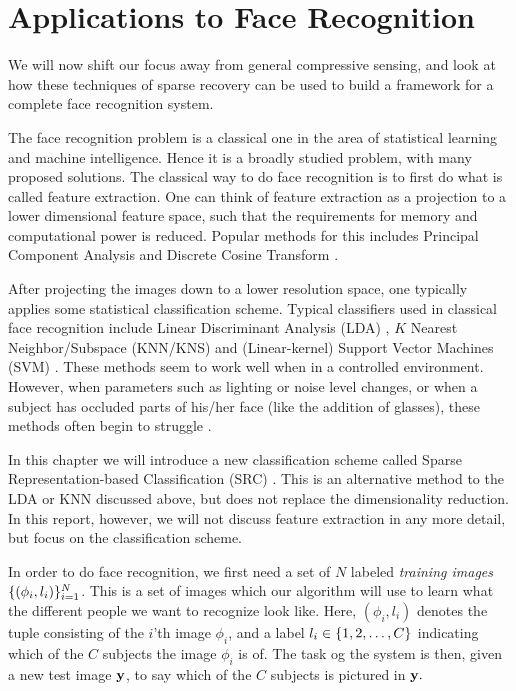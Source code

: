 \chapter{Applications to Face Recognition} \label{sec:applications}
We will now shift our focus away from general compressive sensing, and look at how these techniques of sparse recovery can be used to build a framework for a complete face recognition system. 

The face recognition problem is a classical one in the area of statistical learning and machine intelligence. Hence it is a broadly studied problem, with many proposed solutions. The classical way to do face recognition is to first do what is called feature extraction. One can think of feature extraction as a projection to a lower dimensional feature space, such that the requirements for memory and computational power is reduced. Popular methods for this includes Principal Component Analysis and Discrete Cosine Transform \cite{bhat2014performance}.

After projecting the images down to a lower resolution space, one typically applies some statistical classification scheme. Typical classifiers used in classical face recognition include  Linear Discriminant Analysis (LDA) \cite{bhat2014performance}, $ K $ Nearest Neighbor/Subspace (KNN/KNS) \cite{lee2005acquiring} and (Linear-kernel) Support Vector Machines (SVM) \cite{wright09facerecog}. These methods seem to work well when in a controlled environment. However, when parameters such as lighting or noise level changes, or when a subject has occluded parts of his/her face (like the addition of glasses), these methods often begin to struggle \cite{eldar12theoryapplic}.

In this chapter we will introduce a new classification scheme called Sparse Representation-based Classification (SRC) \cite{wright09facerecog}. This is an alternative method to the LDA or KNN discussed above, but does not replace the dimensionality reduction. In this report, however, we will not discuss feature extraction in any more detail, but focus on the classification scheme. 

In order to do face recognition, we first need a set of $ N $ labeled \textit{training images} $ \{(\phi_{i}, l_{i})\}_{i=1}^{N} $. This is a set of images which our algorithm will use to learn what the different people we want to recognize look like. Here, $ (\phi_{i}, l_{i}) $ denotes the tuple consisting of the $ i $'th image $ \phi_{i} $, and a label $ l_{i} \in \{1, 2, \ldots, C\} $ indicating which of the $ C $ subjects the image $ \phi_{i} $ is of. The task og the system is then, given a new test image $ \mathbf{y} $, to say which of the $ C $ subjects is pictured in $ \mathbf{y}. $




